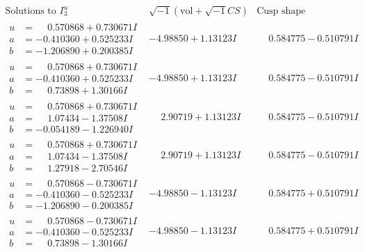 \documentclass[1p]{elsarticle_modified}
\theoremstyle{definition}
\newcommand{\I}{\sqrt{-1}}
\begin{document}
$$\begin{array}{c|c|c}  
\text{Solutions to }I^u_{3}& \I (\text{vol} + \sqrt{-1}CS) & \text{Cusp shape}\\
 \hline 
\begin{aligned}
u &= \phantom{-}0.570868 + 0.730671 I \\
a &= -0.410360 + 0.525233 I \\
b &= -1.206890 + 0.200385 I\end{aligned}
 & -4.98850 + 1.13123 I & \phantom{-}0.584775 - 0.510791 I \\ \hline\begin{aligned}
u &= \phantom{-}0.570868 + 0.730671 I \\
a &= -0.410360 + 0.525233 I \\
b &= \phantom{-}0.73898 + 1.30166 I\end{aligned}
 & -4.98850 + 1.13123 I & \phantom{-}0.584775 - 0.510791 I \\ \hline\begin{aligned}
u &= \phantom{-}0.570868 + 0.730671 I \\
a &= \phantom{-}1.07434 - 1.37508 I \\
b &= -0.054189 - 1.226940 I\end{aligned}
 & \phantom{-}2.90719 + 1.13123 I & \phantom{-}0.584775 - 0.510791 I \\ \hline\begin{aligned}
u &= \phantom{-}0.570868 + 0.730671 I \\
a &= \phantom{-}1.07434 - 1.37508 I \\
b &= \phantom{-}1.27918 - 2.70546 I\end{aligned}
 & \phantom{-}2.90719 + 1.13123 I & \phantom{-}0.584775 - 0.510791 I \\ \hline\begin{aligned}
u &= \phantom{-}0.570868 - 0.730671 I \\
a &= -0.410360 - 0.525233 I \\
b &= -1.206890 - 0.200385 I\end{aligned}
 & -4.98850 - 1.13123 I & \phantom{-}0.584775 + 0.510791 I \\ \hline\begin{aligned}
u &= \phantom{-}0.570868 - 0.730671 I \\
a &= -0.410360 - 0.525233 I \\
b &= \phantom{-}0.73898 - 1.30166 I\end{aligned}
 & -4.98850 - 1.13123 I & \phantom{-}0.584775 + 0.510791 I \\ \hline\begin{aligned}

\end{aligned}
\end{array}$$
\end{document}
